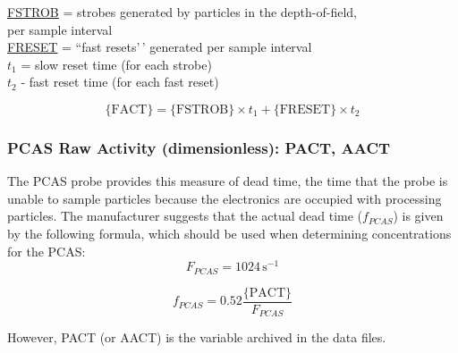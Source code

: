 \documentclass[
]{book}
\begin{document}
\protect\hyperlink{fstrob}{FSTROB} = strobes generated by particles in the depth-of-field,\\
\hspace*{0.333em}\hspace*{0.333em}\hspace*{0.333em}\hspace*{0.333em}\hspace*{0.333em}\hspace*{0.333em}\hspace*{0.333em}\hspace*{0.333em}\hspace*{0.333em}\hspace*{0.333em}per sample interval\\
\protect\hyperlink{freset}{FRESET} = ``fast resets'\,' generated per sample interval\\
\(t_{1}\) = slow reset time (for each strobe)\\
\(t_{2}\) - fast reset time (for each fast reset)

\begin{equation}
\mathrm{\{FACT\}=\{FSTROB\}}\times t_{1}+\mathrm{\{FRESET\}}\times t_{2}
\label{eq:FACTbox}
\end{equation}

\hypertarget{AACT}{%
\subsubsection*{PCAS Raw Activity (dimensionless): PACT, AACT}\label{AACT}}

The PCAS probe provides this measure of dead time, the time that the probe is unable to sample particles because the electronics are occupied with processing particles. The manufacturer suggests that the actual dead time (\(f_{PCAS}\)) is given by the following formula, which should be used when determining concentrations for the PCAS:\\

\[F_{PCAS} = 1024\,\mathrm{s}^{-1}\]

\begin{equation}
f_{PCAS} = 0.52\frac{\mathrm{\{PACT\}}}{F_{PCAS}}
\label{eq:fPCAS}
\end{equation}

However, PACT (or AACT) is the variable archived in the data files.

\hypertarget{appendix-appendices}{%
\appendix}
\end{document}
